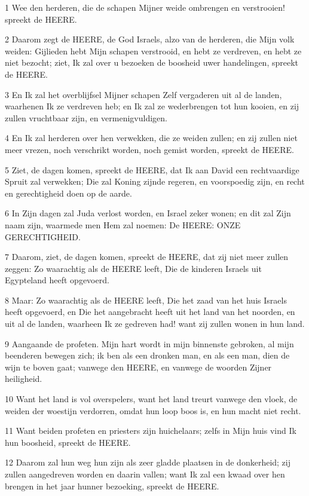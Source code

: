 \par 1 Wee den herderen, die de schapen Mijner weide ombrengen en verstrooien! spreekt de HEERE.
\par 2 Daarom zegt de HEERE, de God Israels, alzo van de herderen, die Mijn volk weiden: Gijlieden hebt Mijn schapen verstrooid, en hebt ze verdreven, en hebt ze niet bezocht; ziet, Ik zal over u bezoeken de boosheid uwer handelingen, spreekt de HEERE.
\par 3 En Ik zal het overblijfsel Mijner schapen Zelf vergaderen uit al de landen, waarhenen Ik ze verdreven heb; en Ik zal ze wederbrengen tot hun kooien, en zij zullen vruchtbaar zijn, en vermenigvuldigen.
\par 4 En Ik zal herderen over hen verwekken, die ze weiden zullen; en zij zullen niet meer vrezen, noch verschrikt worden, noch gemist worden, spreekt de HEERE.
\par 5 Ziet, de dagen komen, spreekt de HEERE, dat Ik aan David een rechtvaardige Spruit zal verwekken; Die zal Koning zijnde regeren, en voorspoedig zijn, en recht en gerechtigheid doen op de aarde.
\par 6 In Zijn dagen zal Juda verlost worden, en Israel zeker wonen; en dit zal Zijn naam zijn, waarmede men Hem zal noemen: De HEERE: ONZE GERECHTIGHEID.
\par 7 Daarom, ziet, de dagen komen, spreekt de HEERE, dat zij niet meer zullen zeggen: Zo waarachtig als de HEERE leeft, Die de kinderen Israels uit Egypteland heeft opgevoerd.
\par 8 Maar: Zo waarachtig als de HEERE leeft, Die het zaad van het huis Israels heeft opgevoerd, en Die het aangebracht heeft uit het land van het noorden, en uit al de landen, waarheen Ik ze gedreven had! want zij zullen wonen in hun land.
\par 9 Aangaande de profeten. Mijn hart wordt in mijn binnenste gebroken, al mijn beenderen bewegen zich; ik ben als een dronken man, en als een man, dien de wijn te boven gaat; vanwege den HEERE, en vanwege de woorden Zijner heiligheid.
\par 10 Want het land is vol overspelers, want het land treurt vanwege den vloek, de weiden der woestijn verdorren, omdat hun loop boos is, en hun macht niet recht.
\par 11 Want beiden profeten en priesters zijn huichelaars; zelfs in Mijn huis vind Ik hun boosheid, spreekt de HEERE.
\par 12 Daarom zal hun weg hun zijn als zeer gladde plaatsen in de donkerheid; zij zullen aangedreven worden en daarin vallen; want Ik zal een kwaad over hen brengen in het jaar hunner bezoeking, spreekt de HEERE.
